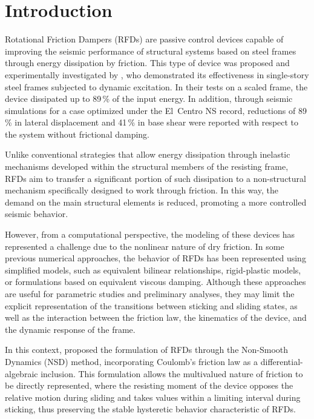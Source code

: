 \documentclass[preprint,12pt,authoryear]{elsarticle}
\begin{document}
\section{Introduction}
\label{sec:intro}

Rotational Friction Dampers (RFDs) are passive control devices capable of
improving the seismic performance of structural systems based on steel frames
through energy dissipation by friction. This type of device was proposed and
experimentally investigated by \citet{Mualla2002}, who demonstrated its
effectiveness in single-story steel frames subjected to dynamic excitation. In
their tests on a scaled frame, the device dissipated up to 89\,\% of the input
energy. In addition, through seismic simulations for a case optimized under the
El~Centro NS record, reductions of 89\,\% in lateral displacement and 41\,\% in
base shear were reported with respect to the system without frictional damping.

Unlike conventional strategies that allow energy dissipation through inelastic
mechanisms developed within the structural members of the resisting frame, RFDs
aim to transfer a significant portion of such dissipation to a non-structural
mechanism specifically designed to work through friction. In this way, the
demand on the main structural elements is reduced, promoting a more controlled
seismic behavior.

However, from a computational perspective, the modeling of these devices has
represented a challenge due to the nonlinear nature of dry friction. In some
previous numerical approaches, the behavior of RFDs has been represented using
simplified models, such as equivalent bilinear relationships, rigid-plastic
models, or formulations based on equivalent viscous damping. Although these
approaches are useful for parametric studies and preliminary analyses, they may
limit the explicit representation of the transitions between sticking and sliding
states, as well as the interaction between the friction law, the kinematics of
the device, and the dynamic response of the frame.

In this context, \citet{Namorado2024} proposed the formulation of RFDs through
the Non-Smooth Dynamics (NSD) method, incorporating Coulomb's friction law as a
differential-algebraic inclusion. This formulation allows the multivalued nature
of friction to be directly represented, where the resisting moment of the device
opposes the relative motion during sliding and takes values within a limiting
interval during sticking, thus preserving the stable hysteretic behavior
characteristic of RFDs.
\end{document}

